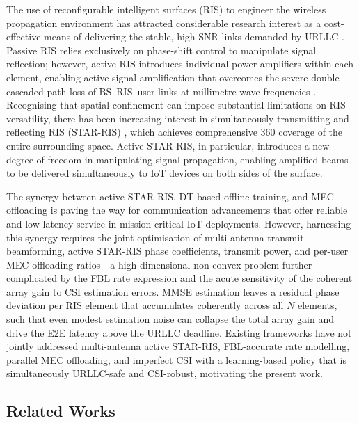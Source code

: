 \documentclass[journal]{IEEEtran}
\begin{document}
The use of reconfigurable intelligent surfaces (RIS) to engineer the
wireless propagation environment has attracted considerable research
interest as a cost-effective means of delivering the stable, high-SNR
links demanded by URLLC
\cite{basar2019wireless,wu2021tutorial,pan2021reconfigurable}. Passive
RIS relies exclusively on phase-shift control to manipulate signal
reflection; however, active RIS introduces individual power amplifiers
within each element, enabling active signal amplification that
overcomes the severe double-cascaded path loss of BS--RIS--user links
at millimetre-wave frequencies
\cite{long2021active,zhang2023activevspassive}. Recognising that
spatial confinement can impose substantial limitations on RIS
versatility, there has been increasing interest in simultaneously
transmitting and reflecting RIS (STAR-RIS) \cite{liu2021star,mu2022star},
which achieves comprehensive 360\textdegree{} coverage of the entire
surrounding space. Active STAR-RIS, in particular, introduces a new
degree of freedom in manipulating signal propagation, enabling
amplified beams to be delivered simultaneously to IoT devices on both
sides of the surface.

The synergy between active STAR-RIS, DT-based offline training, and
MEC offloading is paving the way for communication advancements that
offer reliable and low-latency service in mission-critical IoT
deployments. However, harnessing this synergy requires the joint
optimisation of multi-antenna transmit beamforming, active STAR-RIS
phase coefficients, transmit power, and per-user MEC offloading
ratios---a high-dimensional non-convex problem further complicated by
the FBL rate expression and the acute sensitivity of the coherent
array gain to CSI estimation errors. MMSE estimation leaves a residual
phase deviation per RIS element that accumulates coherently across all
$N$ elements, such that even modest estimation noise can collapse the
total array gain and drive the E2E latency above the URLLC deadline.
Existing frameworks have not jointly addressed multi-antenna active
STAR-RIS, FBL-accurate rate modelling, parallel MEC offloading, and
imperfect CSI with a learning-based policy that is simultaneously
URLLC-safe and CSI-robust, motivating the present work.

\subsection{Related Works}
\label{sec:related}
\end{document}
